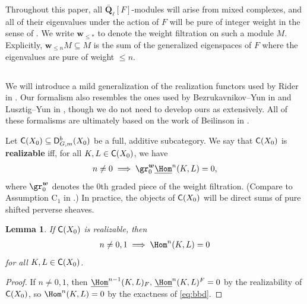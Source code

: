 \documentclass[a4paper,10pt,leqno]{amsart}
\theoremstyle{plain}
\theoremstyle{plain}
\theoremstyle{plain}
\newtheorem{lem}[thm]{Lemma}
\theoremstyle{definition}
\theoremstyle{remark}
\newcommand{\dfemph}[1]{\textbf{#1}}
\newcommand{\QL}{\bar{\mathbf{Q}}_\ell}
\begin{document}
Throughout this paper, all $\QL[F]$-modules will arise from mixed complexes, and all of their eigenvalues under the action of $F$ will be pure of integer weight in the sense of \cite[\S{1.2.1}]{deligne_1980}.
We write $\bm{w}_{\leq \ast}$ to denote the weight filtration on such a module $M$.
Explicitly, $\bm{w}_{\leq n} M \subseteq M$ is the sum of the generalized eigenspaces of $F$ where the eigenvalues are pure of weight $\leq n$.

\subsection{}

We will introduce a mild generalization of the realization functors used by Rider in \cite{rider}.
Our formalism also resembles the ones used by Bezrukavnikov--Yun in \cite[Appendix B]{by} and Lusztig--Yun in \cite[\S{9}]{ly_2020}, though we do not need to develop ours as extensively.
All of these formalisms are ultimately based on the work of Beilinson in \cite{beilinson}.

Let $\sf{C}(X_0) \subseteq \sf{D}_{G, m}^b(X_0)$ be a full, additive subcategory.
We say that $\sf{C}(X_0)$ is \dfemph{realizable} iff, for all $K, L \in \sf{C}(X_0)$, we have
\begin{align}\label{eq:realizable}
n \neq 0 \implies \gr_0^{\bm{w}} \SHom^n(K, L) = 0,
\end{align}
where $\gr_0^{\bm{w}}$ denotes the $0$th graded piece of the weight filtration.
(Compare to Assumption $\mathrm{C}_1$ in \cite[\S{B.1}]{by}.)
In practice, the objects of $\sf{C}(X_0)$ will be direct sums of pure shifted perverse sheaves.

\begin{lem}
If $\sf{C}(X_0)$ is realizable, then
\begin{align}\label{eq:zero-one}
n \neq 0, 1 \implies \Hom^n(K, L) = 0
\end{align}
for all $K, L \in \sf{C}(X_0)$.
\end{lem}

\begin{proof}
If $n \neq 0, 1$, then $\SHom^{n - 1}(K, L)_F,\,\SHom^n(K, L)^F = 0$ by the realizability of $\sf{C}(X_0)$, so $\Hom^n(K, L) = 0$ by the exactness of \eqref{eq:bbd}.
\end{proof}
\end{document}
